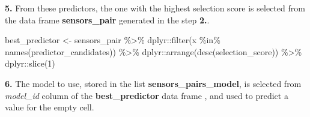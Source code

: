 \documentclass[
  table]{article}
\newenvironment{Shaded}{\begin{snugshade}}{\end{snugshade}}
\newcommand{\AttributeTok}[1]{\textcolor[rgb]{0.77,0.63,0.00}{#1}}
\newcommand{\ConstantTok}[1]{\textcolor[rgb]{0.00,0.00,0.00}{#1}}
\newcommand{\DecValTok}[1]{\textcolor[rgb]{0.00,0.00,0.81}{#1}}
\newcommand{\FunctionTok}[1]{\textcolor[rgb]{0.00,0.00,0.00}{#1}}
\newcommand{\NormalTok}[1]{#1}
\newcommand{\OtherTok}[1]{\textcolor[rgb]{0.56,0.35,0.01}{#1}}
\newcommand{\SpecialCharTok}[1]{\textcolor[rgb]{0.00,0.00,0.00}{#1}}
\newcommand{\StringTok}[1]{\textcolor[rgb]{0.31,0.60,0.02}{#1}}
\begin{document}
\textbf{5.} From these predictors, the one with the highest selection
score is selected from the data frame \textbf{sensors\_pair} generated
in the step \textbf{2.}.

\begin{Shaded}
\begin{Highlighting}[]
\NormalTok{best\_predictor }\OtherTok{\textless{}{-}}\NormalTok{ sensors\_pair }\SpecialCharTok{\%\textgreater{}\%} 
\NormalTok{  dplyr}\SpecialCharTok{::}\FunctionTok{filter}\NormalTok{(x }\SpecialCharTok{\%in\%} \FunctionTok{names}\NormalTok{(predictor\_candidates)) }\SpecialCharTok{\%\textgreater{}\%}
\NormalTok{  dplyr}\SpecialCharTok{::}\FunctionTok{arrange}\NormalTok{(}\FunctionTok{desc}\NormalTok{(selection\_score)) }\SpecialCharTok{\%\textgreater{}\%} 
\NormalTok{  dplyr}\SpecialCharTok{::}\FunctionTok{slice}\NormalTok{(}\DecValTok{1}\NormalTok{)}
\end{Highlighting}
\end{Shaded}

\begin{table}[H]
\centering
{}
\end{table}

\textbf{6.} The model to use, stored in the list
\textbf{sensors\_pairs\_model}, is selected from \emph{model\_id} column
of the \textbf{best\_predictor} data frame , and used to predict a value
for the empty cell.

\begin{Shaded}
\end{Shaded}
\end{document}
